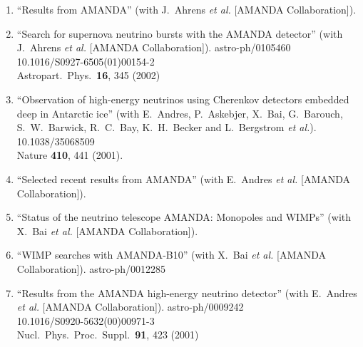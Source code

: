 \begin{enumerate}


\item ``Results from AMANDA'' (with J.~Ahrens {\it et al.}  [AMANDA Collaboration]).
  



\item ``Search for supernova neutrino bursts with the AMANDA detector'' (with J.~Ahrens {\it et al.}  [AMANDA Collaboration]). astro-ph/0105460
    \\{}10.1016/S0927-6505(01)00154-2
\\{}Astropart.\ Phys.\  {\bf 16}, 345 (2002) %


\item ``Observation of high-energy neutrinos using Cherenkov detectors embedded deep in Antarctic ice'' (with E.~Andres, P.~Askebjer, X.~Bai, G.~Barouch, S.~W.~Barwick, R.~C.~Bay, K.~H.~Becker and L.~Bergstrom {\it et al.}). 10.1038/35068509
\\{}Nature {\bf 410}, 441 (2001). %



\item ``Selected recent results from AMANDA'' (with E.~Andres {\it et al.}  [AMANDA Collaboration]).
  


\item ``Status of the neutrino telescope AMANDA: Monopoles and WIMPs'' (with X.~Bai {\it et al.}  [AMANDA Collaboration]).
  



\item ``WIMP searches with AMANDA-B10'' (with X.~Bai {\it et al.}  [AMANDA Collaboration]). astro-ph/0012285
  


\item ``Results from the AMANDA high-energy neutrino detector'' (with E.~Andres {\it et al.}  [AMANDA Collaboration]). astro-ph/0009242
    \\{}10.1016/S0920-5632(00)00971-3
\\{}Nucl.\ Phys.\ Proc.\ Suppl.\  {\bf 91}, 423 (2001) %



\end{enumerate}
